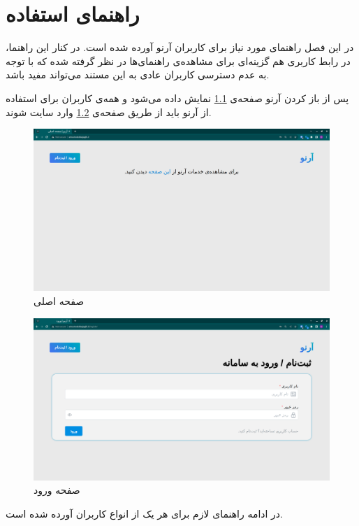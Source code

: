 \chapter{راهنمای استفاده}

در این فصل راهنمای مورد نیاز برای کاربران آرنو آورده شده است.
در کنار این راهنما، در رابط کاربری هم گزینه‌ای برای مشاهده‌ی راهنمای‌ها در نظر گرفته شده که با توجه به عدم دسترسی کاربران عادی به این مستند می‌تواند مفید باشد.

پس از باز کردن آرنو صفحه‌ی \ref{home} نمایش داده می‌شود و همه‌ی کاربران برای استفاده از آرنو باید از طریق صفحه‌ی \ref{login} وارد سایت شوند. 

\begin{figure}[h]
	\centering
	\includegraphics[width=\textwidth]{figs/user-guide/home}
	\caption{صفحه اصلی}
	\label{home}
\end{figure}

\begin{figure}[h]
	\centering
	\includegraphics[width=\textwidth]{figs/user-guide/login}
	\caption{صفحه ورود}
	\label{login}
\end{figure}

در ادامه راهنمای لازم برای هر یک از انواع کاربران آورده ‌شده است.

